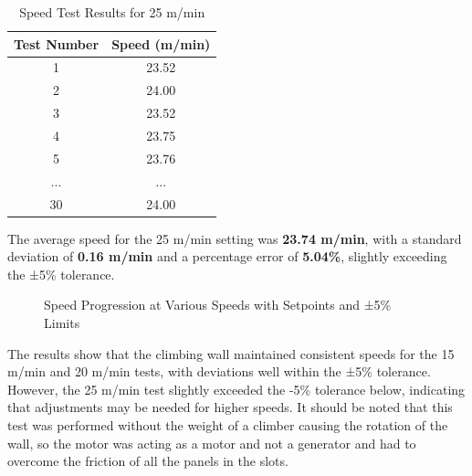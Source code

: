 \begin{table}[H]
\centering
\caption{Speed Test Results for 25 m/min}
\label{tab:speed_test_25}
\begin{tabular}{|c|c|}
\hline
\textbf{Test Number} & \textbf{Speed (m/min)} \\ \hline
1  & 23.52 \\ \hline
2  & 24.00 \\ \hline
3  & 23.52 \\ \hline
4  & 23.75 \\ \hline
5  & 23.76 \\ \hline
...  & ...  \\ \hline
30 & 24.00 \\ \hline
\end{tabular}
\end{table}
The average speed for the 25 m/min setting was \textbf{23.74 m/min}, with a standard deviation of \textbf{0.16 m/min} and a percentage error of \textbf{5.04\%}, slightly exceeding the ±5\% tolerance.

\begin{figure}[H]
    \centering
    \caption{Speed Progression at Various Speeds with Setpoints and ±5\% Limits}
    \label{fig:speed_progression}
\end{figure}

The results show that the climbing wall maintained consistent speeds for the 15 m/min and 20 m/min tests, with deviations well within the ±5\% tolerance. However, the 25 m/min test slightly exceeded the -5\% tolerance below, indicating that adjustments may be needed for higher speeds. It should be noted that this test was performed without the weight of a climber causing the rotation of the wall, so the motor was acting as a motor and not a generator and had to overcome the friction of all the panels in the slots.

